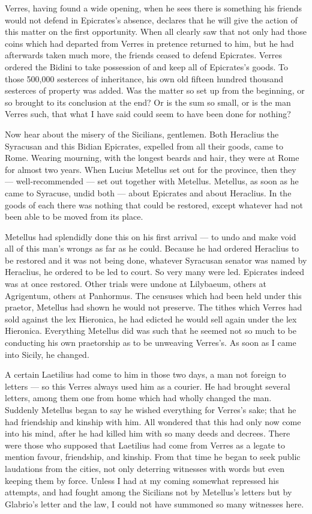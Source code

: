  Verres, having found a wide opening, when he sees there is something his friends would not defend in Epicrates's absence, declares that he will give the action of this matter on the first opportunity. When all clearly saw that not only had those coins which had departed from Verres in pretence returned to him, but he had afterwards taken much more, the friends ceased to defend Epicrates. Verres ordered the Bidini to take possession of and keep all of Epicrates's goods. To those 500,000 sesterces of inheritance, his own old fifteen hundred thousand sesterces of property was added. Was the matter so set up from the beginning, or so brought to its conclusion at the end? Or is the sum so small, or is the man Verres such, that what I have said could seem to have been done for nothing?

 Now hear about the misery of the Sicilians, gentlemen. Both Heraclius the Syracusan and this Bidian Epicrates, expelled from all their goods, came to Rome. Wearing mourning, with the longest beards and hair, they were at Rome for almost two years. When Lucius Metellus set out for the province, then they --- well-recommended --- set out together with Metellus. Metellus, as soon as he came to Syracuse, undid both --- about Epicrates and about Heraclius. In the goods of each there was nothing that could be restored, except whatever had not been able to be moved from its place.

 Metellus had splendidly done this on his first arrival --- to undo and make void all of this man's wrongs as far as he could. Because he had ordered Heraclius to be restored and it was not being done, whatever Syracusan senator was named by Heraclius, he ordered to be led to court. So very many were led. Epicrates indeed was at once restored. Other trials were undone at Lilybaeum, others at Agrigentum, others at Panhormus. The censuses which had been held under this praetor, Metellus had shown he would not preserve. The tithes which Verres had sold against the lex Hieronica, he had edicted he would sell again under the lex Hieronica. Everything Metellus did was such that he seemed not so much to be conducting his own praetorship as to be unweaving Verres's. As soon as I came into Sicily, he changed.

 A certain Laetilius had come to him in those two days, a man not foreign to letters --- so this Verres always used him as a courier. He had brought several letters, among them one from home which had wholly changed the man. Suddenly Metellus began to say he wished everything for Verres's sake; that he had friendship and kinship with him. All wondered that this had only now come into his mind, after he had killed him with so many deeds and decrees. There were those who supposed that Laetilius had come from Verres as a legate to mention favour, friendship, and kinship. From that time he began to seek public laudations from the cities, not only deterring witnesses with words but even keeping them by force. Unless I had at my coming somewhat repressed his attempts, and had fought among the Sicilians not by Metellus's letters but by Glabrio's letter and the law, I could not have summoned so many witnesses here.

